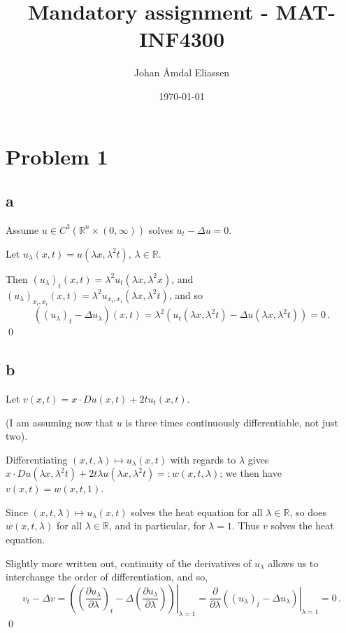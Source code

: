 \documentclass[11pt]{amsart}
\theoremstyle{definition}
\newcommand{\R}{\mathbb{R}}
\numberwithin{equation}{section}
\begin{document}
\title{Mandatory assignment - MAT-INF4300}
\author{Johan Åmdal Eliassen}

\maketitle

\date{\today}
\section{Problem 1}
\subsection*{a}
Assume $u \in C^3(\R^n \times (0,\infty))$ solves $u_t - \Delta u = 0$.

Let $u_\lambda(x,t) = u(\lambda x, \lambda^2 t)$, $\lambda \in \R$.

\newcommand{\ul}{u_\lambda}
Then $(\ul)_t(x,t) = \lambda^2 u_t(\lambda x, \lambda^2 x)$, and $(\ul)_{x_i, x_i}(x, t) = \lambda^2 u_{x_i,x_i}(\lambda x, \lambda^2 t)$, and so 
\begin{equation}
((\ul)_t - \Delta \ul)(x,t) = \lambda^2 (u_t(\lambda x, \lambda^2 t) - \Delta u(\lambda x, \lambda^2 t)) = 0\,.
\end{equation}
\qed

\subsection*{b} Let $v(x,t) = x \cdot Du(x,t) + 2tu_t(x,t)$.

(I am assuming now that $u$ is three times continuously differentiable, not just two).

Differentiating $(x, t, \lambda) \mapsto u_\lambda(x, t)$ with regards to $\lambda$ gives $x \cdot Du(\lambda x, \lambda^2 t) + 2t\lambda u(\lambda x, \lambda^2 t) =: w(x,t,\lambda)$; we then have $v(x, t) = w(x, t, 1)$. 

Since $(x,t,\lambda) \mapsto u_\lambda(x,t)$ solves the heat equation for all $\lambda \in \R$, so does $w(x,t,\lambda)$ for all $\lambda \in \R$, and in particular, for $\lambda = 1$. Thus $v$ solves the heat equation.

Slightly more written out, continuity of the derivatives of $u_\lambda$ allows us to interchange the order of differentiation, and so,
\begin{equation}
v_t - \Delta v
=
\left.\left(
 \left(\frac{\partial u_\lambda}{\partial \lambda}
\right)_t 
- \Delta \left(
\frac{\partial u_\lambda}{\partial \lambda}
\right)\right)\right|_{\lambda = 1}
= \left.
\frac{\partial}{\partial \lambda}
\left(
(u_\lambda)_t - \Delta u_\lambda
\right)\right|_{\lambda = 1} = 0\,.
\end{equation}
 \qed
 
\end{document}

